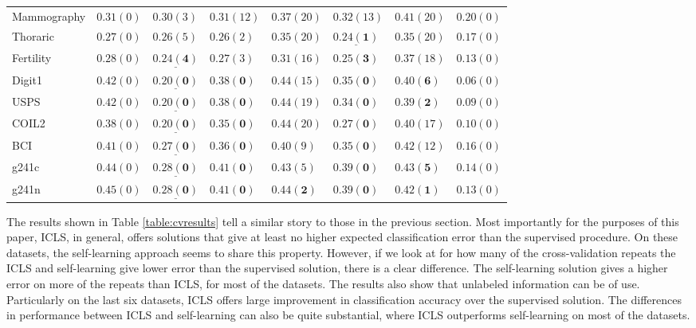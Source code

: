 \documentclass{elsarticle}
\begin{document}
\begin{table}
\begin{tabular}{l|lllllll}
Mammography & $0.31 (0)$& $0.30 (3)$& $0.31 (12)$& $0.37 (20)$& $0.32 (13)$& $0.41 (20)$& $0.20 (0)$\\ 
Thoraric & $0.27 (0)$& $0.26 (5)$& $0.26 (2)$& $0.35 (20)$& $\mathbf{\underline{0.24 (1)}} $& $0.35 (20)$& $0.17 (0)$\\ 
Fertility & $0.28 (0)$& $\mathbf{\underline{0.24 (4)}} $& $0.27 (3)$& $0.31 (16)$& $\mathbf{0.25 (3)} $& $0.37 (18)$& $0.13 (0)$\\ 
Digit1 & $0.42 (0)$& $\mathbf{\underline{0.20 (0)}} $& $\mathbf{0.38 (0)} $& $0.44 (15)$& $\mathbf{0.35 (0)} $& $\mathbf{0.40 (6)} $& $0.06 (0)$\\ 
USPS & $0.42 (0)$& $\mathbf{\underline{0.20 (0)}} $& $\mathbf{0.38 (0)} $& $0.44 (19)$& $\mathbf{0.34 (0)} $& $\mathbf{0.39 (2)} $& $0.09 (0)$\\ 
COIL2 & $0.38 (0)$& $\mathbf{\underline{0.20 (0)}} $& $\mathbf{0.35 (0)} $& $0.44 (20)$& $\mathbf{0.27 (0)} $& $0.40 (17)$& $0.10 (0)$\\ 
BCI & $0.41 (0)$& $\mathbf{\underline{0.27 (0)}} $& $\mathbf{0.36 (0)} $& $0.40 (9)$& $\mathbf{0.35 (0)} $& $0.42 (12)$& $0.16 (0)$\\ 
g241c & $0.44 (0)$& $\mathbf{\underline{0.28 (0)}} $& $\mathbf{0.41 (0)} $& $0.43 (5)$& $\mathbf{0.39 (0)} $& $\mathbf{0.43 (5)} $& $0.14 (0)$\\ 
g241n & $0.45 (0)$& $\mathbf{\underline{0.28 (0)}} $& $\mathbf{0.41 (0)} $& $\mathbf{0.44 (2)} $& $\mathbf{0.39 (0)} $& $\mathbf{0.42 (1)} $& $0.13 (0)$\\ 
\end{tabular}
\end{table}

The results shown in Table \ref{table:cvresults} tell a similar story to those in the previous section. Most importantly for the purposes of this paper, ICLS, in general, offers solutions that give at least no higher expected classification error than the supervised procedure. On these datasets, the self-learning approach seems to share this property. However, if we look at for how many of the cross-validation repeats the ICLS and self-learning give lower error than the supervised solution, there is a clear difference. The self-learning solution gives a higher error on more of the repeats than ICLS, for most of the datasets. The results also show that unlabeled information can be of use. Particularly on the last six datasets, ICLS offers large improvement in classification accuracy over the supervised solution. The differences in performance between ICLS and self-learning can also be quite substantial, where ICLS outperforms self-learning on most of the datasets.
\end{document}
